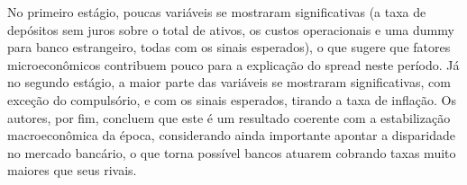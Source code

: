 \documentclass[a4paper, 12pt, openany, oneside, brazil]{abntex2}
\begin{document}
    No primeiro estágio, poucas variáveis se mostraram significativas (a taxa
    de depósitos sem juros sobre o total de ativos, os custos operacionais e
    uma dummy para banco estrangeiro, todas com os sinais esperados), o que
    sugere que fatores microeconômicos contribuem pouco para a explicação do
    spread neste período. Já no segundo estágio, a maior parte das variáveis se
    mostraram significativas, com exceção do compulsório, e com os sinais
    esperados, tirando a taxa de inflação. Os autores, por fim, concluem que
    este é um resultado coerente com a estabilização macroeconômica da época,
    considerando ainda importante apontar a disparidade no mercado bancário, o
    que torna possível bancos atuarem cobrando taxas muito maiores que seus
    rivais.




\end{document}
